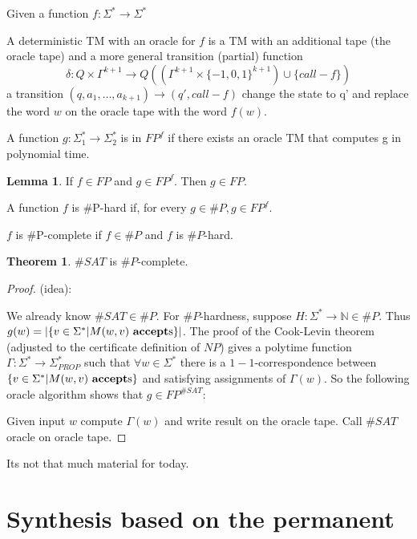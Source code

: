 \documentclass[a4paper,12pt]{article}
\theoremstyle{definition}
\newtheorem{lemma}[counter]{Lemma}
\newtheorem{theorem}[counter]{Theorem}
\theoremstyle{remark}
\newcommand{\N}{\mathbb{N}}
\begin{document}
Given a function $f: \Sigma^* \to \Sigma^*$

A deterministic TM with an oracle for $f$ is a TM with an additional tape (the oracle tape) and a more general transition (partial) function
\begin{equation*}
    \delta: Q \times \Gamma^{k+1} \to Q((\Gamma^{k+1} \times \{-1, 0, 1\}^{k+1}) \cup \{call-f\}) %
\end{equation*}
a transition $(q, a_1, \dots, a_{k+1}) \to (q', call-f)$
change the state to q' and replace the word $w$ on the oracle tape with the word $f(w)$.

A function $g: \Sigma_1^* \to \Sigma_2^*$ is in $FP^f$ if there exists an oracle TM 
that computes g in polynomial time.

\begin{lemma}
    If $f \in FP$ and $g \in FP^f$. Then $g \in FP$.
\end{lemma}

A function $f$ is $\#$P-hard if, for every $g \in \#P, g \in FP^f$.

$f$ is $\#$P-complete if $f \in \#P$ and $f$ is $\#P$-hard.

\begin{theorem}
    $\#SAT$ is $\#P$-complete.
\end{theorem}

\begin{proof}
    (idea):

    We already know $\#SAT \in \#P$. For $\#P$-hardness, suppose $H: \Sigma^* \to \N \in \#P$.
    Thus $g(w) = |\{v \in \Sigma^* | M(w, v) \text{ \textbf{accept}s}\}|$. The proof of the Cook-Levin theorem
    (adjusted to the certificate definition of $NP$) gives a polytime function $\Gamma: \Sigma^* \to \Sigma_{PROP}^*$ such that
    $\forall w \in \Sigma^*$ there is a $1-1$-correspondence between $\{v \in \Sigma^* | M(w, v) \text{ \textbf{accept}s}\}$ and
    satisfying assignments of $\Gamma(w)$. So the following oracle algorithm shows that $g \in FP^{\#SAT}$:

    Given input $w$ compute $\Gamma(w)$ and write result on the oracle tape. Call $\#SAT$ oracle on oracle tape.
\end{proof}








\newpage
Its not that much material for today.
\section{Synthesis based on the permanent}
\end{document}

